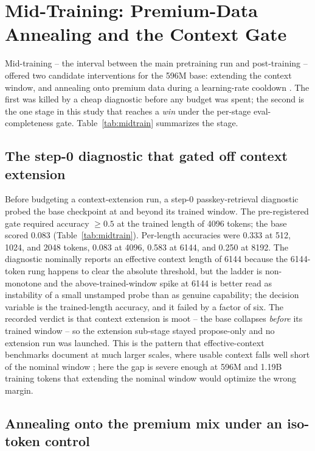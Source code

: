 \section{Mid-Training: Premium-Data Annealing and the Context Gate}\label{sec:midtrain}

Mid-training -- the interval between the main pretraining run and post-training -- offered two candidate interventions for the 596M base: extending the context window, and annealing onto premium data during a learning-rate cooldown \citep{hu2024minicpm, olmo20242}. The first was killed by a cheap diagnostic before any budget was spent; the second is the one stage in this study that reaches a \emph{win} under the per-stage eval-completeness gate. Table~\ref{tab:midtrain} summarizes the stage.



\subsection{The step-0 diagnostic that gated off context extension}\label{sec:midtrain-gate}

Before budgeting a context-extension run, a step-0 passkey-retrieval diagnostic \citep{mohtashami2023landmark} probed the base checkpoint at and beyond its trained window. The pre-registered gate required accuracy $\geq 0.5$ at the trained length of 4096 tokens; the base scored 0.083 (Table~\ref{tab:midtrain}). Per-length accuracies were 0.333 at 512, 1024, and 2048 tokens, 0.083 at 4096, 0.583 at 6144, and 0.250 at 8192. The diagnostic nominally reports an effective context length of 6144 because the 6144-token rung happens to clear the absolute threshold, but the ladder is non-monotone and the above-trained-window spike at 6144 is better read as instability of a small unstamped probe than as genuine capability; the decision variable is the trained-length accuracy, and it failed by a factor of six. The recorded verdict is that context extension is moot -- the base collapses \emph{before} its trained window -- so the extension sub-stage stayed propose-only and no extension run was launched. This is the pattern that effective-context benchmarks document at much larger scales, where usable context falls well short of the nominal window \citep{hsieh2024ruler}; here the gap is severe enough at 596M and 1.19B training tokens that extending the nominal window would optimize the wrong margin.

\subsection{Annealing onto the premium mix under an iso-token control}\label{sec:midtrain-anneal}

